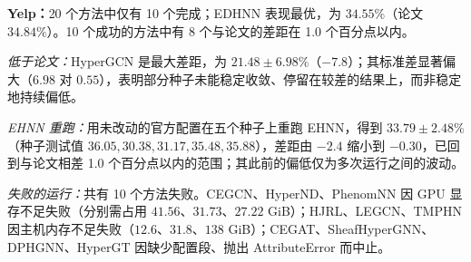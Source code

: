 \documentclass[11pt,a4paper]{article}
\begin{document}
\par\smallskip
\noindent\textbf{Yelp：}20 个方法中仅有 10 个完成；EDHNN 表现最优，为 $34.55\%$（论文 $34.84\%$）。10 个成功的方法中有 8 个与论文的差距在 1.0 个百分点以内。

\noindent\textit{低于论文：}HyperGCN 是最大差距，为 $21.48\pm6.98\%$（$-7.8$）；其标准差显著偏大（$6.98$ 对 $0.55$），表明部分种子未能稳定收敛、停留在较差的结果上，而非稳定地持续偏低。

\noindent\textit{EHNN 重跑：}用未改动的官方配置在五个种子上重跑 EHNN，得到 $33.79\pm2.48\%$（种子测试值 $36.05, 30.38, 31.17, 35.48, 35.88$），差距由 $-2.4$ 缩小到 $-0.30$，已回到与论文相差 1.0 个百分点以内的范围；其此前的偏低仅为多次运行之间的波动。

\noindent\textit{失败的运行：}共有 10 个方法失败。CEGCN、HyperND、PhenomNN 因 GPU 显存不足失败（分别需占用 $41.56$、$31.73$、$27.22$ GiB）；HJRL、LEGCN、TMPHN 因主机内存不足失败（$12.6$、$31.8$、$138$ GiB）；CEGAT、SheafHyperGNN、DPHGNN、HyperGT 因缺少配置段、抛出 AttributeError 而中止。
\end{document}
